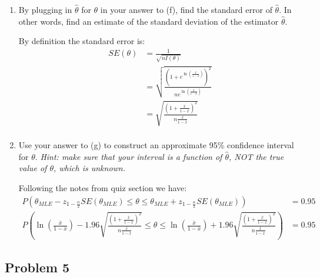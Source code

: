 \documentclass{article}
\newcommand{\1}{\mathbf{1}}
\begin{document}
\begin{enumerate}
    \newpage
    \item By plugging in $\hat{\theta}$ for $\theta$ in your answer to (f), find the standard error of $\hat{\theta}$. In other words, find an estimate of the standard deviation of the estimator $\hat{\theta}$.
    
    By definition the standard error is:
    \begin{align*}
        SE(\theta) &= \frac{1}{\sqrt{nI(\theta)}} \\
        &= \sqrt{\frac{(1+e^{ \ln{\left( \frac{\bar x}{1 - \bar x} \right)  }})^2}{ne^{ \ln{\left( \frac{\bar x}{1 - \bar x} \right)  }}}} \\
        &= \sqrt{\frac{(1 + \frac{\bar x}{1 - \bar x} )^2}{n\frac{\bar x}{1 - \bar x} }} \\
    \end{align*}
    
    \item Use your answer to (g) to construct an approximate 95\% confidence interval for $\theta$. {\it Hint: make sure that your interval is a function of $\hat{\theta}$, NOT the true value of $\theta$, which is unknown.}
    
    Following the notes from quiz section we have: 
        \begin{align*}
        P\left(\theta_{MLE} - z_{1-\frac{\alpha}{2}}SE(\theta_{MLE}) \leq \theta \leq \theta_{MLE} + z_{1-\frac{\alpha}{2}}SE(\theta_{MLE})\right) &= 0.95 \\
        P\left(  \ln{\left( \frac{\bar x}{1 - \bar x} \right)  }   - 1.96\sqrt{\frac{(1 + \frac{\bar x}{1 - \bar x} )^2}{n\frac{\bar x}{1 - \bar x} }}  \leq \theta \leq  \ln{\left( \frac{\bar x}{1 - \bar x} \right)  }  + 1.96\sqrt{\frac{(1 + \frac{\bar x}{1 - \bar x} )^2}{n\frac{\bar x}{1 - \bar x} }} \right) &= 0.95
    \end{align*} 
\end{enumerate}


\newpage
\subsection*{Problem 5}
\end{document}
